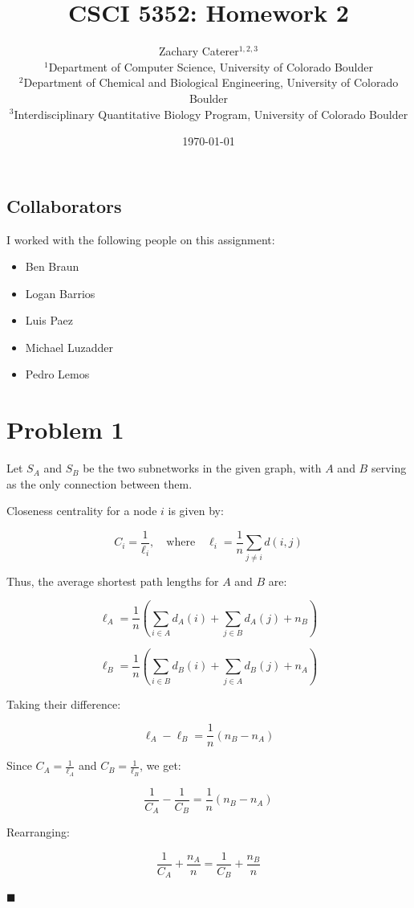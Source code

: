 \documentclass[12pt]{article}
\title{CSCI 5352: Homework 2}
\author{
    Zachary Caterer$^{1,2,3}$ \\
    \small $^1$Department of Computer Science, University of Colorado Boulder \\
    \small $^2$Department of Chemical and Biological Engineering, University of Colorado Boulder \\
    \small $^3$Interdisciplinary Quantitative Biology Program, University of Colorado Boulder
}
\date{\today}
\begin{document}
\maketitle

\subsection*{Collaborators}
I worked with the following people on this assignment:

\begin{itemize}
    \item Ben Braun
    \item Logan Barrios
    \item Luis Paez
    \item Michael Luzadder
    \item Pedro Lemos
\end{itemize}

\section*{Problem 1}

Let \( S_A \) and \( S_B \) be the two subnetworks in the given graph, with \( A \) and \( B \) serving as the only connection between them.

Closeness centrality for a node \( i \) is given by:

\[
C_i = \frac{1}{\ell_i}, \quad \text{where} \quad \ell_i = \frac{1}{n} \sum_{j \neq i} d(i,j)
\]

Thus, the average shortest path lengths for \( A \) and \( B \) are:

\[
\ell_A = \frac{1}{n} \left( \sum_{i \in A} d_A(i) + \sum_{j \in B} d_A(j) + n_B \right)
\]

\[
\ell_B = \frac{1}{n} \left( \sum_{i \in B} d_B(i) + \sum_{j \in A} d_B(j) + n_A \right)
\]

Taking their difference:

\[
\ell_A - \ell_B = \frac{1}{n} (n_B - n_A)
\]

Since \( C_A = \frac{1}{\ell_A} \) and \( C_B = \frac{1}{\ell_B} \), we get:

\[
\frac{1}{C_A} - \frac{1}{C_B} = \frac{1}{n} (n_B - n_A)
\]

Rearranging:

\[
\frac{1}{C_A} + \frac{n_A}{n} = \frac{1}{C_B} + \frac{n_B}{n}
\]


\begin{flushright}
    \( \blacksquare \)
\end{flushright}
\end{document}
